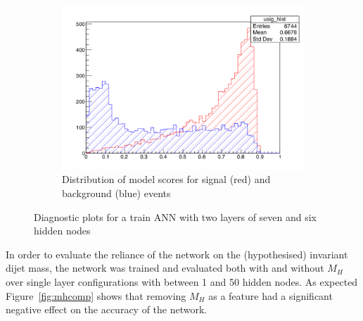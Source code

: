 \begin{figure}[h]
	\begin{subfigure}{0.5\textwidth}
	      \includegraphics[width=\textwidth]{img/sep}
	      \caption{Distribution of model scores for signal (red) and background (blue) events}
	\end{subfigure}

	\caption{Diagnostic plots for a train ANN with two layers of seven and six hidden nodes }
	\label{fig:label}
\end{figure}

In order to evaluate the reliance of the network on the (hypothesised) invariant dijet mass, the network was trained and evaluated both with and without $M_H$ over single layer configurations with between 1 and 50 hidden nodes.
As expected Figure~\ref{fig:mhcomp} shows that removing $M_H$ as a feature had a significant negative effect on the accuracy of the network.

